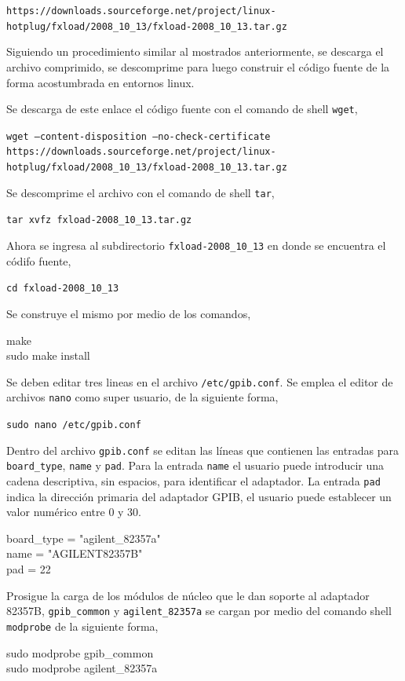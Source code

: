 \documentclass[paper=letter,oneside,fontsize=11pt, parskip=full]{scrartcl}
\newcommand{\code}[1]{{\ttfamily #1}}
\begin{document}
		\texttt{https://downloads.sourceforge.net/project/linux-hotplug/fxload/2008\_10\_13/fxload-2008\_10\_13.tar.gz}		
		
 		Siguiendo un procedimiento similar al mostrados anteriormente, se descarga el archivo comprimido, se descomprime para luego construir el código fuente de la forma acostumbrada en entornos linux. 
		
		Se descarga de este enlace el código fuente con el comando de shell \texttt{wget},
		
		\texttt{wget --content-disposition --no-check-certificate https://downloads.sourceforge.net/project/linux-hotplug/fxload/2008\_10\_13/fxload-2008\_10\_13.tar.gz}
		
		Se descomprime el archivo con el comando de shell \texttt{tar},
		
		\texttt{tar xvfz fxload-2008\_10\_13.tar.gz}
		
		Ahora se ingresa al subdirectorio \texttt{fxload-2008\_10\_13} en donde se encuentra el códifo fuente,
		
		\texttt{cd fxload-2008\_10\_13}
		
		Se construye el mismo por medio de los comandos,
		
		\code{
			make	\\		
			sudo make install
		}
		
		Se deben editar tres lineas en el archivo \texttt{/etc/gpib.conf}. Se emplea el editor de archivos \texttt{nano} como super usuario, de la siguiente forma, 
		
		\texttt{sudo nano /etc/gpib.conf}		
		
		Dentro del archivo \texttt{gpib.conf} se editan las líneas que contienen las entradas para \texttt{board\_type}, \texttt{name} y \texttt{pad}. Para la entrada \texttt{name} el usuario puede introducir una cadena descriptiva, sin espacios, para identificar el adaptador. La entrada \texttt{pad} indica la dirección primaria del adaptador GPIB, el usuario puede establecer un valor numérico entre 0 y 30.
		
		\code{			
			board\_type = "agilent\_82357a" \\		
			name = "AGILENT82357B" \\		
			pad = 22
		}
		
		Prosigue la carga de los módulos de núcleo que le dan soporte al adaptador 82357B, \texttt{gpib\_common} y \texttt{agilent\_82357a} se cargan por medio del comando shell \texttt{modprobe} de la siguiente forma,
		
		\code{
			sudo modprobe gpib\_common \\		
			sudo modprobe agilent\_82357a
		}
		
\end{document}
